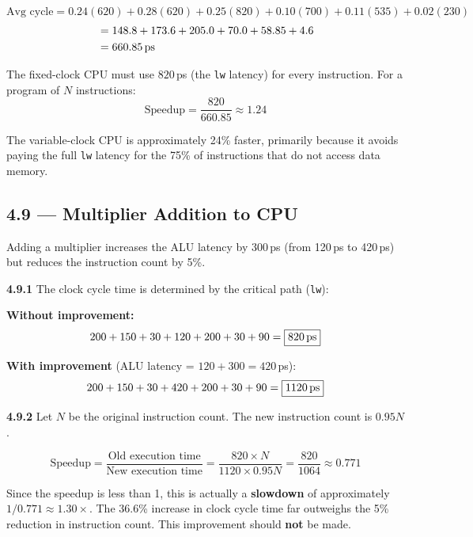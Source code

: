 \[
  \text{Avg cycle} = 0.24(620) + 0.28(620) + 0.25(820) + 0.10(700) +
                     0.11(535) + 0.02(230)
\]
\begin{align*}
  &= 148.8 + 173.6 + 205.0 + 70.0 + 58.85 + 4.6 \\
  &= 660.85\text{\,ps}
\end{align*}

The fixed-clock CPU must use $820$\,ps (the \texttt{lw} latency) for every
instruction.  For a program of $N$ instructions:
\[
  \text{Speedup} = \frac{820}{660.85} \approx \boxed{1.24}
\]

The variable-clock CPU is approximately 24\% faster, primarily because it
avoids paying the full \texttt{lw} latency for the 75\% of instructions that
do not access data memory.

\subsection*{4.9 --- Multiplier Addition to CPU}
\hypertarget{sol-4.9}{}

Adding a multiplier increases the ALU latency by 300\,ps (from 120\,ps to
420\,ps) but reduces the instruction count by 5\%.

\medskip\noindent\textbf{4.9.1}
The clock cycle time is determined by the critical path (\texttt{lw}):

\textbf{Without improvement:}
\[
  200 + 150 + 30 + 120 + 200 + 30 + 90 = \boxed{820\text{\,ps}}
\]

\textbf{With improvement} (ALU latency = $120 + 300 = 420$\,ps):
\[
  200 + 150 + 30 + 420 + 200 + 30 + 90 = \boxed{1120\text{\,ps}}
\]

\medskip\noindent\textbf{4.9.2}
Let $N$ be the original instruction count.  The new instruction count is
$0.95N$.

\[
  \text{Speedup} = \frac{\text{Old execution time}}{\text{New execution time}}
  = \frac{820 \times N}{1120 \times 0.95N}
  = \frac{820}{1064} \approx \boxed{0.771}
\]

Since the speedup is less than 1, this is actually a \textbf{slowdown} of
approximately $1/0.771 \approx 1.30\times$.  The 36.6\% increase in clock
cycle time far outweighs the 5\% reduction in instruction count.  This
improvement should \textbf{not} be made.

